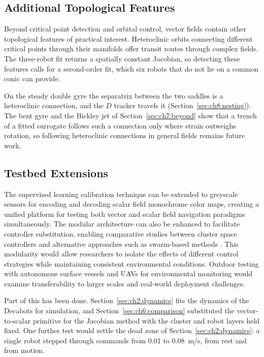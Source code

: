 \subsection{Additional Topological Features}
\label{sec:ch9:features}

Beyond critical point detection and orbital control, vector fields contain other topological features of practical interest. Heteroclinic orbits connecting different critical points through their manifolds offer transit routes through complex fields. The three-robot fit returns a spatially constant Jacobian, so detecting these features calls for a second-order fit, which six robots that do not lie on a common conic can provide.

On the steady double gyre the separatrix between the two saddles is a
heteroclinic connection, and the $D$ tracker travels it
(Section~\ref{sec:ch8:nesting}). The bent gyre and the Bickley jet of
Section~\ref{sec:ch7:beyond} show that a trench of a fitted surrogate
follows such a connection only where strain outweighs rotation, so
following heteroclinic connections in general fields remains future work.

\subsection{Testbed Extensions}
\label{sec:ch9:testbed}

The supervised learning calibration technique can be extended to
greyscale sensors for encoding and decoding scalar field monochrome color
maps, creating a unified platform for testing both vector and scalar
field navigation paradigms simultaneously. The modular architecture can
also be enhanced to facilitate controller substitution, enabling
comparative studies between cluster space controllers and alternative
approaches such as swarm-based methods \cite{44}. This modularity
would allow researchers to isolate the effects of different control
strategies while maintaining consistent environmental conditions.
Outdoor testing with autonomous surface vessels \cite{2} and UAVs for
environmental monitoring \cite{69} would examine transferability to
larger scales and real-world deployment challenges.

Part of this has been done. Section~\ref{sec:ch2:dynamics} fits the dynamics
of the Decabots for simulation, and Section~\ref{sec:ch6:comparison}
substituted the vector-to-scalar primitive for the Jacobian method with the
cluster and robot layers held fixed. One further test would settle the dead
zone of Section~\ref{sec:ch2:dynamics}: a single robot stepped through
commands from 0.01 to 0.08~m/s, from rest and from motion.

